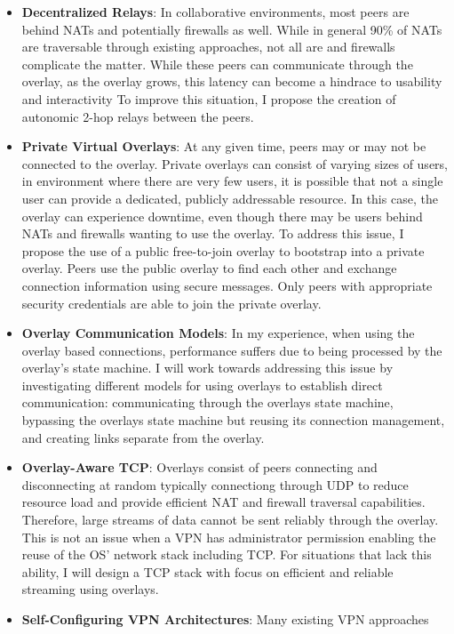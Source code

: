 \begin{itemize}
\item \textbf{Decentralized Relays}:  In collaborative environments, most peers
are behind NATs and potentially firewalls as well.  While in general 90\% of
NATs are traversable through existing approaches, not all are and firewalls
complicate the matter.  While these peers can communicate through the overlay,
as the overlay grows, this latency can become a hindrace to usability and
interactivity To improve this situation, I propose the creation of autonomic
2-hop relays between the peers.
\item \textbf{Private Virtual Overlays}:  At any given time, peers may or may
not be connected to the overlay.  Private overlays can consist of varying sizes
of users, in environment where there are very few users, it is possible that
not a single user can provide a dedicated, publicly addressable  resource.  In
this case, the overlay can experience downtime, even though there may be users
behind NATs and firewalls wanting to use the overlay.  To address this issue,
I propose the use of a public free-to-join overlay to bootstrap into a private
overlay.  Peers use the public overlay to find each other and exchange connection
information using secure messages.  Only peers with appropriate security
credentials are able to join the private overlay.
\item \textbf{Overlay Communication Models}: In my experience, when using the
overlay based connections, performance suffers due to being processed by the
overlay's state machine.  I will work towards addressing this issue by
investigating different models for using overlays to establish direct
communication:  communicating through the overlays state machine, bypassing the
overlays state machine but reusing its connection management, and creating
links separate from the overlay.
\item \textbf{Overlay-Aware TCP}: Overlays consist of peers connecting and
disconnecting at random typically connectiong through UDP to reduce resource
load and provide efficient NAT and firewall traversal capabilities.  Therefore,
large streams of data cannot be sent reliably through the overlay.  This is not
an issue when a VPN has administrator permission enabling the reuse of the OS'
network stack including TCP.  For situations that lack this ability, I will
design a TCP stack with focus on efficient and reliable streaming using
overlays.
\item \textbf{Self-Configuring VPN Architectures}: Many existing VPN approaches

\end{itemize}
